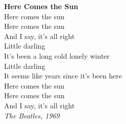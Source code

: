 \label{sec:quotation}
\begin{minipage}[c]{0.8\textwidth}
    \textbf{Here Comes the Sun} \\
    Here comes the sun \\
    Here comes the sun \\
    And I say, it's all right \\

    Little darling \\
    It's been a long cold lonely winter \\
    Little darling \\
    It seems like years since it's been here \\
    
    Here comes the sun \\
    Here comes the sun \\
    And I say, it's all right \\

    \textit{The Beatles, 1969}
\end{minipage}
